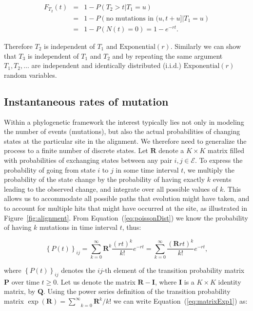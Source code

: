 \begin{eqnarray}
F_{T_{2}}(t) &=& 1-P\left(T_{2}>t|T_{1}=u\right) \\ \nonumber
& = & 1-P\left(\text{no mutations in }(u,t+u]|T_{1}=u\right) \\ \nonumber 
& = & 1-P\left(N(t)=0\right)=1-e^{-r t}.
\end{eqnarray}

\noindent
Therefore $T_2$ is independent of $T_1$ and $\text{Exponential}(r)$. 
Similarly we can show that $T_3$ is independent of $T_1$ and $T_2$ and by repeating the same argument $T_1,T_2,\ldots$ are independent and identically distributed (i.i.d.) $\text{Exponential}(r)$ random variables.


\subsection{Instantaneous rates of mutation\label{sub:rates}}

Within a phylogenetic framework the interest typically lies not only in modeling the number of events (mutations), but also the actual probabilities of changing states at the particular site in the alignment. 
We therefore need to generalize the process to a finite number of discrete states.
Let $\mathbf{R}$ denote a $K \times K$ matrix filled with probabilities of exchanging states between any pair $i,j\in \mathcal{E}$.
To express the probability of going from state $i$ to $j$ in some time interval $t$, we multiply the probability of the state change by the probability of having exactly $k$ events leading to the observed change, and integrate over all possible values of $k$.
This allows us to accommodate all possible paths that evolution might have taken, and to account for multiple hits that might have occurred at the site, as illustrated in Figure~\ref{fig:alignment}.
From Equation~(\ref{eq:poissonDist}) we know the probability of having $k$ mutations in time interval $t$, thus:

\begin{equation}
\left\{ P(t)\right\} _{ij}=\underset{k=0}{\overset{\infty}{\sum}}\mathbf{R}^{k}\frac{(r t)^{k}}{k!}e^{-r t}=\underset{k=0}{\overset{\infty}{\sum}}\frac{(\mathbf{R}r t)^{k}}{k!}e^{-r t},
\label{eq:matrixExp1}
\end{equation}

\noindent
where $\left\{ P(t)\right\} _{ij}$ denotes the $ij\text{-th}$ element of the transition probability matrix $\mathbf{P}$ over time $t \geq 0$.
Let us denote the matrix $\mathbf{R}-\mathbf{I}$, where $\mathbf{I}$ is a $K \times K$ identity matrix, by $\mathbf{Q}$.
Using the power series definition of the transition probability matrix $\exp(\mathbf{R})=\underset{k=0}{\overset{\infty}{\sum}}\mathbf{R}^{k}/k!$ we can write Equation~(\ref{eq:matrixExp1}) as:

